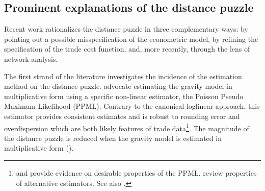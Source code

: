 \documentclass[12pt,twoside,a4paper,notitlepage]{article}
\begin{document}

\subsection*{Prominent explanations of the distance puzzle}
Recent work rationalizes the distance puzzle in three complementary ways: by pointing out a possible misspecification of the econometric model, by refining the specification of the trade cost function, and, more recently, through the lens of network analysis.

The first strand of the literature investigates the incidence of the estimation method on the distance puzzle.
\cite{SantosSilva2006} advocate estimating the gravity model in multiplicative form using a specific non-linear estimator, the Poisson Pseudo Maximum Likelihood (PPML).
Contrary to the canonical loglinear approach, this estimator provides consistent estimates and is robust to rounding error and overdispersion which are both likely features of trade data\footnote{\cite{SantosSilva2011} and \cite{Fally2015} provide evidence on desirable properties of the PPML.
 \cite{Head2014} review properties of alternative estimators.
See also \cite{Bosquet2015,Bosquet2014}.}.
The magnitude of the distance puzzle is reduced when the gravity model is estimated in multiplicative form (\cite{Bosquet2015, Head2013}).
\end{document}
